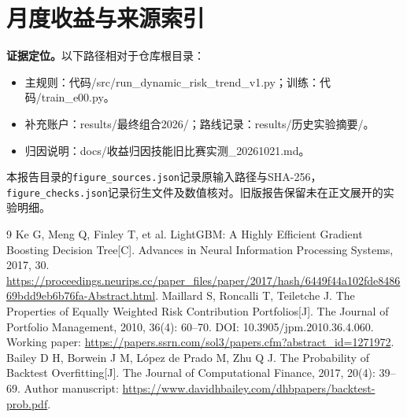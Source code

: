 \documentclass[11pt,a4paper]{article}
\begin{document}
\clearpage
\section{月度收益与来源索引}


\noindent\textbf{证据定位。}以下路径相对于仓库根目录：
\begin{itemize}\small
\item 主规则：代码/src/run\_dynamic\_risk\_trend\_v1.py；训练：代码/train\_e00.py。
\item 补充账户：results/最终组合2026/；路线记录：results/历史实验摘要/。
\item 归因说明：docs/收益归因技能旧比赛实测\_20261021.md。
\end{itemize}
本报告目录的\texttt{figure\_sources.json}记录原输入路径与SHA-256，\texttt{figure\_checks.json}记录衍生文件及数值核对。旧版报告保留未在正文展开的实验明细。

\begingroup\small\raggedright
\begin{thebibliography}{9}
 Ke G, Meng Q, Finley T, et al. LightGBM: A Highly Efficient Gradient Boosting Decision Tree[C]. Advances in Neural Information Processing Systems, 2017, 30. \url{https://proceedings.neurips.cc/paper_files/paper/2017/hash/6449f44a102fde848669bdd9eb6b76fa-Abstract.html}.
 Maillard S, Roncalli T, Teiletche J. The Properties of Equally Weighted Risk Contribution Portfolios[J]. The Journal of Portfolio Management, 2010, 36(4): 60--70. DOI: 10.3905/jpm.2010.36.4.060. Working paper: \url{https://papers.ssrn.com/sol3/papers.cfm?abstract_id=1271972}.
 Bailey D H, Borwein J M, López de Prado M, Zhu Q J. The Probability of Backtest Overfitting[J]. The Journal of Computational Finance, 2017, 20(4): 39--69. Author manuscript: \url{https://www.davidhbailey.com/dhbpapers/backtest-prob.pdf}.
\end{thebibliography}\endgroup
\end{document}
